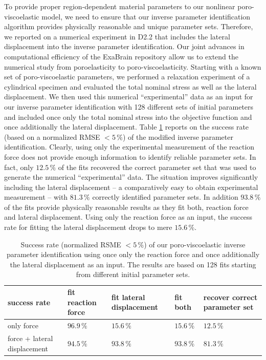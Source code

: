 \documentclass[a4paper,12pt]{article}
\begin{document}
To provide proper region-dependent material parameters to our nonlinear poro-viscoelastic model, we need to ensure that our inverse parameter identification algorithm provides physically reasonable and unique parameter sets. Therefore, we reported on a numerical experiment in D2.2 that includes the lateral displacement into the inverse parameter identification. Our joint advances in computational efficiency of the ExaBrain repository allow us to extend the numerical study from poroelasticity to poro-viscoelasticity. Starting with a known set of poro-viscoelastic parameters, we performed a relaxation experiment of a cylindrical specimen and evaluated the total nominal stress as well as the lateral displacement. We then used this numerical “experimental” data as an input for our inverse parameter identification with 128 different sets
of initial parameters and included once only the total nominal stress into the objective function and once additionally the lateral displacement. Table \ref{tab:num_experiment} reports on the success rate (based on a normalized RMSE $<5\,\%$) of the modified inverse parameter identification. Clearly, using only the experimental measurement of the reaction force does not provide enough information to identify reliable parameter sets. In fact, only $12.5\,\%$ of the fits recovered the correct parameter set that was used to generate the numerical “experimental” data. The situation improves significantly including the lateral displacement -- a comparatively easy to obtain experimental measurement -- with $81.3\,\%$ correctly identified parameter sets. In addition $93.8\,\%$ of the fits provide physically reasonable results as they fit both, reaction force and lateral displacement. Using only the reaction force as an input, the success rate for fitting the lateral displacement drops to mere $15.6\,\%$.

\begin{table}[h]
    \centering
    \begin{tabular}{>{\centering\arraybackslash}m{3cm} >{\centering\arraybackslash}m{2.5cm} >{\centering\arraybackslash}m{2.5cm} >{\centering\arraybackslash}m{2cm} >{\centering\arraybackslash}m{3cm}}
    \toprule
         success rate &  fit reaction force & fit lateral displacement & fit both & recover correct parameter set\\ 
    \midrule
         only force & $96.9\,\%$ & $15.6\,\%$ & $15.6\,\%$ & $12.5\,\%$\\[10pt]
         force + lateral displacement & $94.5\,\%$ & $93.8\,\%$ & $93.8\,\%$ & $81.3\,\%$\\
    \bottomrule
    \end{tabular}
    \caption{Success rate (normalized RSME $<5\,\%$) of our poro-viscoelastic inverse parameter identification using once only the reaction force and once additionally the lateral displacement as an input. The results are based on 128 fits starting from different initial parameter sets.}
    \label{tab:num_experiment}
\end{table}
\end{document}

